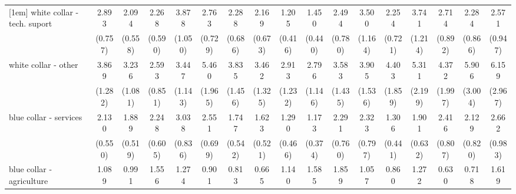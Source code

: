 {\begin{tabular}{l*{16}{c}}
[1em]
white collar - tech. suport&       2.893\sym{***}&       2.094\sym{**} &       2.268\sym{**} &       3.878\sym{***}&       2.763\sym{***}&       2.288\sym{**} &       2.169\sym{*}  &       1.205         &       1.450         &       2.494\sym{**} &       3.500\sym{***}&       2.254\sym{*}  &       3.741\sym{***}&       2.714\sym{**} &       2.284\sym{*}  &       2.571\sym{*}  \\
                    &     (0.757)         &     (0.558)         &     (0.590)         &     (1.050)         &     (0.729)         &     (0.686)         &     (0.673)         &     (0.416)         &     (0.440)         &     (0.780)         &     (1.164)         &     (0.721)         &     (1.214)         &     (0.892)         &     (0.866)         &     (0.947)         \\
[1em]
white collar - other&       3.869\sym{***}&       3.236\sym{***}&       2.593\sym{**} &       3.447\sym{***}&       5.460\sym{***}&       3.835\sym{***}&       3.462\sym{**} &       2.913\sym{*}  &       2.796\sym{*}  &       3.583\sym{**} &       3.905\sym{***}&       4.403\sym{***}&       5.311\sym{***}&       4.372\sym{**} &       5.906\sym{***}&       6.159\sym{***}\\
                    &     (1.282)         &     (1.081)         &     (0.851)         &     (1.143)         &     (1.965)         &     (1.456)         &     (1.325)         &     (1.232)         &     (1.146)         &     (1.435)         &     (1.536)         &     (1.859)         &     (2.199)         &     (1.997)         &     (3.004)         &     (2.967)         \\
[1em]
blue collar - services&       2.130\sym{**} &       1.889\sym{*}  &       2.248\sym{**} &       3.038\sym{***}&       2.551\sym{***}&       1.747         &       1.623         &       1.290         &       1.173         &       2.291\sym{*}  &       2.323\sym{*}  &       1.306         &       1.901         &       2.416\sym{**} &       2.129\sym{*}  &       2.662\sym{**} \\
                    &     (0.550)         &     (0.519)         &     (0.605)         &     (0.836)         &     (0.699)         &     (0.542)         &     (0.521)         &     (0.466)         &     (0.374)         &     (0.760)         &     (0.797)         &     (0.441)         &     (0.632)         &     (0.807)         &     (0.820)         &     (0.983)         \\
[1em]
blue collar - agriculture&       1.089         &       0.991         &       1.556         &       1.274         &       0.901         &       0.813         &       0.665         &       1.140         &       1.585         &       1.859         &       1.057         &       0.860         &       1.272         &       0.630         &       0.718         &       1.619         \\

\end{tabular}}
